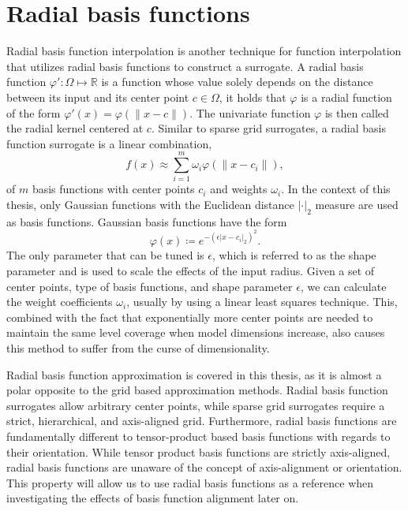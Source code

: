 \documentclass[
  a4paper,  %
  twoside,  %
  bibliography=totoc,
  headsepline,
  cleardoublepage=empty,
  parskip=half,
  draft=false
]{scrbook}
\begin{document}
\section{Radial basis functions}
\label{sec:rbf}

Radial basis function interpolation \cite{Broomhead1988} is another technique for function interpolation that utilizes radial basis functions to construct a surrogate.
A radial basis function $\varphi' \colon \Omega \mapsto \mathds{R}$ is a function whose value solely depends on the distance between its input and its center point $c \in \Omega$, \ie it holds that $\varphi$ is a radial function of the form $\varphi'(x)=\varphi(\|x - c\|)$.
The univariate function $\varphi$ is then called the radial kernel centered at $c$.
Similar to sparse grid surrogates, a radial basis function surrogate is a linear combination,
\begin{equation}
f(x) \approx \sum_{i=1}^m \omega_i \varphi(\|x - c_i\|),
\end{equation}
of $m$ basis functions with center points $c_i$ and weights $\omega_i$.
In the context of this thesis, only Gaussian functions with the Euclidean distance $|\cdot |_2$ measure are used as basis functions.
Gaussian basis functions have the form
\begin{equation}
\varphi(x) \coloneqq e^{-(\epsilon |x - c_i|_2)^2}.
\end{equation}
%
The only parameter that can be tuned is $\epsilon$, which is referred to as the shape parameter and is used to scale the effects of the input radius.
Given a set of center points, type of basis functions, and shape parameter $\epsilon$, we can calculate the weight coefficients $\omega_i$, usually by using a linear least squares technique.
This, combined with the fact that exponentially more center points are needed to maintain the same level coverage when model dimensions increase, also causes this method to suffer from the curse of dimensionality.

Radial basis function approximation is covered in this thesis, as it is almost a polar opposite to the grid based approximation methods.
Radial basis function surrogates allow arbitrary center points, while sparse grid surrogates require a strict, hierarchical, and axis-aligned grid.
Furthermore, radial basis functions are fundamentally different to tensor-product based basis functions with regards to their orientation.
While tensor product basis functions are strictly axis-aligned, radial basis functions are unaware of the concept of axis-alignment or orientation.
This property will allow us to use radial basis functions as a reference when investigating the effects of basis function alignment later on.
\end{document}
